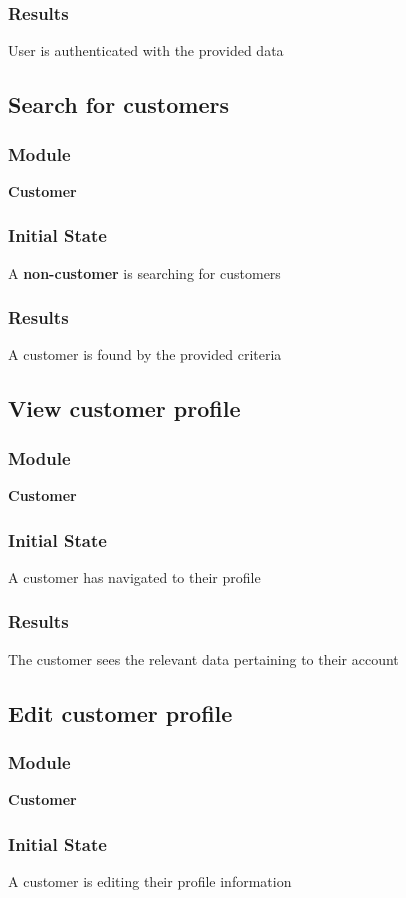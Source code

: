 \documentclass[12pt, titlepage]{article}
\begin{document}
    \subsubsection{Results}
    User is authenticated with the provided data

\subsection{Search for customers}
    \subsubsection{Module}
    \textbf{Customer}
    \subsubsection{Initial State}
    A \textbf{non-customer} is searching for customers
    \subsubsection{Results}
    A customer is found by the provided criteria

\subsection{View customer profile}
    \subsubsection{Module}
    \textbf{Customer}
    \subsubsection{Initial State}
    A customer has navigated to their profile
    \subsubsection{Results}
    The customer sees the relevant data pertaining to their account

\subsection{Edit customer profile}
    \subsubsection{Module}
    \textbf{Customer}
    \subsubsection{Initial State}
    A customer is editing their profile information
\end{document}
